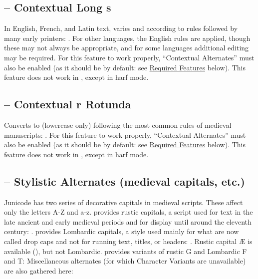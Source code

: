 \subsection{ – Contextual Long s}
In English, French, and Latin text, varies  and  according to rules
followed by many early printers: . For other languages, the English rules are applied, though these may not always be
appropriate, and for some languages additional editing may be required. For this
feature to work properly,  “Contextual Alternates” must also be enabled (as it should be by
default: see \hyperlink{req}{Required Features} below). This feature does not work in {\ltech}, except in harf mode.

\subsection{ –
Contextual r Rotunda}\hypertarget{ss16}{}
Converts  to  (lowercase only) following the
most common rules of medieval manuscripts:
.
For this feature to work properly,
 “Contextual Alternates” must also be enabled (as it should be by default: see
\hyperlink{req}{Required Features} below).  This feature does not work in {\ltech}, except in harf mode.

\subsection{ –
Stylistic Alternates (medieval capitals, etc.)}\hypertarget{salt}{}
Junicode has two series of decorative capitals in medieval scripts. These affect only the letters
A-Z and a-z.  provides rustic capitals, a script used for text in the late
ancient and early medieval periods and for display until around the eleventh century:
. 
provides Lombardic capitals, a style used mainly for what are now called drop caps and not for
running text, titles, or headers:
.
Rustic capital Æ is available (), but not Lombardic.
 provides variants of rustic G and Lombardic F and T:
Miscellaneous alternates (for which Character Variants are
unavailable) are also gathered here:

